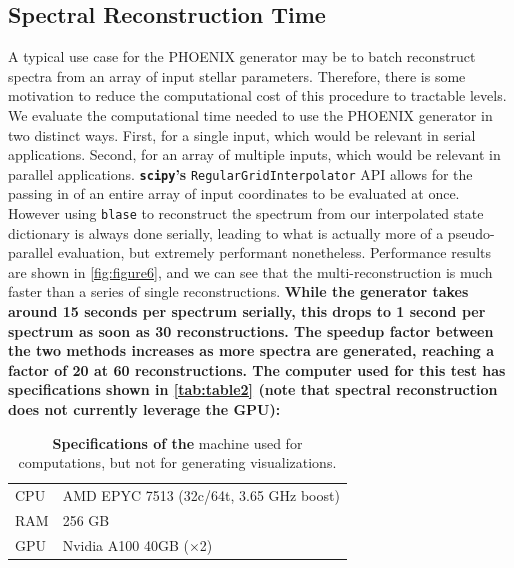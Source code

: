\documentclass[twocolumn, linenumbers]{aastex631}
\begin{document}
\subsection{Spectral Reconstruction Time}
A typical use case for the PHOENIX generator may be to batch reconstruct spectra from an array of input stellar parameters.
Therefore, there is some motivation to reduce the computational cost of this procedure to tractable levels.
We evaluate the computational time needed to use the PHOENIX generator in two distinct ways.
First, for a single input, which would be relevant in serial applications.
Second, for an array of multiple inputs, which would be relevant in parallel applications.
\textbf{\texttt{scipy}'s} \texttt{RegularGridInterpolator} API allows for the passing in of an entire array of input coordinates to be evaluated at once.
However using \texttt{blase} to reconstruct the spectrum from our interpolated state dictionary is always done serially, leading to what is actually more of a pseudo-parallel evaluation, but extremely performant nonetheless.
Performance results are shown in \autoref{fig:figure6}, and we can see that the multi-reconstruction is much faster than a series of single reconstructions.
\textbf{While the generator takes around 15 seconds per spectrum serially, this drops to 1 second per spectrum as soon as 30 reconstructions.
The speedup factor between the two methods increases as more spectra are generated, reaching a factor of 20 at 60 reconstructions.
The computer used for this test has specifications shown in \autoref{tab:table2} (note that spectral reconstruction does not currently leverage the GPU):}
\begin{table}[h!]
    \centering
    \begin{tabular}{ll}
        \hline
        CPU & AMD EPYC 7513 (32c/64t, 3.65 GHz boost)\\
        RAM & 256 GB\\
        GPU & Nvidia A100 40GB ($\times$2)\\
        \hline
    \end{tabular}
    \caption{\textbf{Specifications of the} machine used for computations, but not for generating visualizations.}
    \label{tab:table2}
\end{table}
\end{document}
